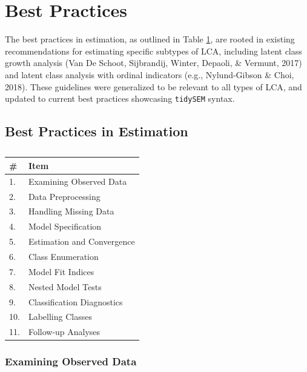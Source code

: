 \documentclass[
  ,man,floatsintext]{apa6}
\begin{document}
\hypertarget{best-practices}{%
\section{Best Practices}\label{best-practices}}

The best practices in estimation, as outlined in Table
\ref{tab:checkest-tab}, are rooted in existing recommendations
for estimating specific subtypes of LCA,
including latent
class growth analysis (Van De Schoot, Sijbrandij, Winter, Depaoli, \& Vermunt, 2017) and latent
class analysis with ordinal indicators (e.g., Nylund-Gibson \& Choi, 2018).
These guidelines were generalized to be relevant to all types of LCA,
and updated to current best practices showcasing \texttt{tidySEM} syntax.

\hypertarget{best-practices-in-estimation}{%
\subsection{Best Practices in Estimation}\label{best-practices-in-estimation}}

\begin{table}

\caption{\label{tab:checkest-tab}}
\centering
\begin{tabular}[t]{l|l}
\hline
\# & Item\\
\hline
1. & Examining Observed Data\\
\hline
2. & Data Preprocessing\\
\hline
3. & Handling Missing Data\\
\hline
4. & Model Specification\\
\hline
5. & Estimation and Convergence\\
\hline
6. & Class Enumeration\\
\hline
7. & Model Fit Indices\\
\hline
8. & Nested Model Tests\\
\hline
9. & Classification Diagnostics\\
\hline
10. & Labelling Classes\\
\hline
11. & Follow-up Analyses\\
\hline
\end{tabular}
\end{table}

\hypertarget{examining-observed-data}{%
\subsubsection{Examining Observed Data}\label{examining-observed-data}}
\end{document}
